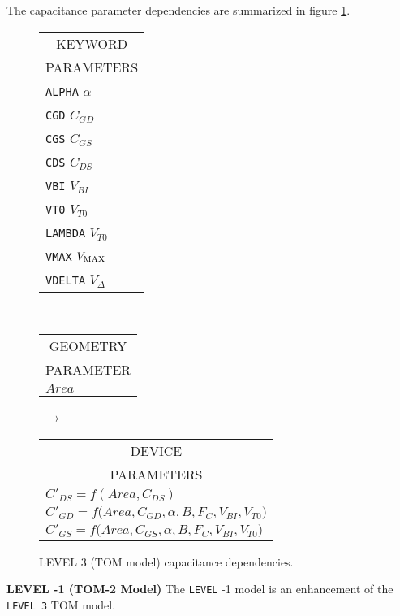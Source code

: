 The capacitance parameter dependencies are summarized in figure
\ref{blevel3cap}.\\[0.2in]
\begin{figure}[h]
\begin{tabular}[t]{|p{1in}|}
\hline
\multicolumn{1}{|c|}{KEYWORD} \\
\multicolumn{1}{|c|}{PARAMETERS} \\
\hline
\hline
{\tt ALPHA} \hfill $\alpha$\\
{\tt CGD} \hfill $C_{GD}$\\
{\tt CGS} \hfill $C_{GS}$\\
{\tt CDS} \hfill $C_{DS}$\\
{\tt VBI} \hfill $V_{BI}$\\
{\tt VT0} \hfill $V_{T0}$\\
{\tt LAMBDA} \hfill $V_{T0}$\\
{\tt VMAX} \hfill $V_{\mbox{\scriptsize MAX}}$\\
{\tt VDELTA} \hfill $V_{\Delta}$\\
\hline
\end{tabular}
\hfill
\parbox{0.2in}{\ \vspace*{0.2in}\newline +}
\hfill
\begin{tabular}[t]{|p{1in}|}
\hline
\multicolumn{1}{|c|}{GEOMETRY} \\
\multicolumn{1}{|c|}{PARAMETER} \\
\hline
\hspace*{\fill}$Area$\\
\hline
\end{tabular}
\hfill
\parbox{0.2in}{\ \vspace*{0.2in}\newline $\rightarrow$}
\hfill
\begin{tabular}[t]{|p{1.8in}|}
\hline
\multicolumn{1}{|c|}{DEVICE} \\
\multicolumn{1}{|c|}{PARAMETERS} \\
\hline
$C'_{DS} = f(Area, C_{DS})$\\
$C'_{GD} = f(Area, C_{GD},$\newline\hspace*{\fill}$
\alpha, B, F_C, V_{BI}, V_{T0})$\\
$C'_{GS} = f(Area, C_{GS},$\newline\hspace*{\fill}$
\alpha, B, F_C, V_{BI}, V_{T0})$\\
\hline
\end{tabular}
\caption{LEVEL 3 (TOM model) capacitance dependencies. \label{blevel3cap}}
\end{figure}
\label{b:level-1:start}
{\noindent\bf LEVEL -1 (TOM-2 Model)}\myline
The {\tt LEVEL} -1 model is an enhancement of the {\tt LEVEL 3} TOM model.

